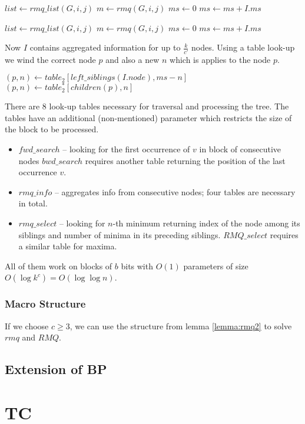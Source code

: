 \begin{algorithmic}
		\State {}
	\Else
		\State $list \gets rmq\_list(G, i, j)$
		\State $m \gets rmq(G, i, j)$
		\State $ms \gets 0$
				\State $ms \gets ms + I.ms$
			\EndIf
		\EndFor
		\State {}
	\EndIf
\EndFunction
\end{algorithmic}

\begin{algorithmic}
		\State {}
	\Else
		\State $list \gets rmq\_list(G, i, j)$
		\State $m \gets rmq(G, i, j)$
		\State $ms \gets 0$
				\State $ms \gets ms + I.ms$
					\State \Break
				\EndIf
			\EndIf
		\EndFor
{}
\end{algorithmic}

Now $I$ contains aggregated information for up to $\frac{k}{c'}$ nodes.
Using a table look-up we wind the correct node $p$ and also a new $n$ which is applies to the node $p$.

\begin{algorithmic}
		\State $(p, n) \gets table_2[left\_siblings(I.node), ms - n]$
			\State $(p, n) \gets table_2^*[children(p), n]$
		\EndWhile
		\State {}
	\EndIf
\EndFunction
\end{algorithmic}

There are 8 look-up tables necessary for traversal and processing the tree.
The tables have an additional (non-mentioned) parameter which restricts the size of the block to be processed.
\begin{itemize}
	\item $fwd\_search$ -- looking for the first occurrence of $v$ in block of consecutive nodes
	$bwd\_search$ requires another table returning the position of the last occurrence $v$.
	\item $rmq\_info$ -- aggregates info from consecutive nodes; four tables are necessary in total.
	\item $rmq\_select$ -- looking for $n$-th minimum returning index of the node among its siblings and number of minima in its preceding siblings.
	$RMQ\_select$ requires a similar table for maxima.
\end{itemize}
All of them work on blocks of $b$ bits with $O(1)$ parameters of size $O(\log k^c) = O(\log \log n)$.

\subsubsection{Macro Structure}

If we choose $c \ge 3$, we can use the structure from lemma \ref{lemma:rmq2} to solve $rmq$ and $RMQ$.

\subsection{Extension of BP}

\section{TC}